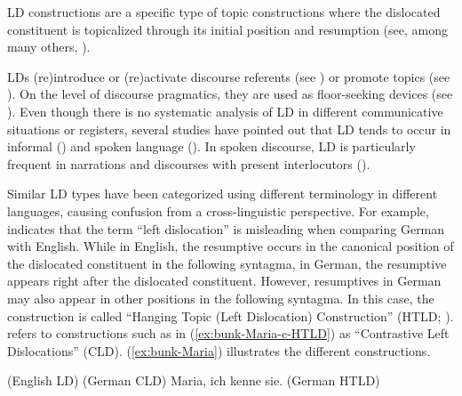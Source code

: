 \documentclass[output=paper,colorlinks,citecolor=brown]{langscibook}
\begin{document}
LD constructions are a specific type of topic constructions where the dislocated constituent is topicalized through its initial position and resumption (see, among many others, \cite{altmann_formen_1981}).

LDs (re)introduce or (re)activate discourse referents (see \cite{westbury_left_2016}) or promote topics (see \cite{gregory_topicalization_2001, frey_pragmatic_2005}). On the level of discourse pragmatics, they are used as floor-seeking devices (see \cite{duranti_left-dislocation_1979}). Even though there is no systematic analysis of LD in different communicative situations or registers, several studies have pointed out that LD tends to occur in informal (\cite{geluykens_discourse_1992}) and spoken language (\cite{shaer_integrated_2004, guryev_left-dislocation_nodate}). In spoken discourse, LD is particularly frequent in narrations and discourses with present interlocutors (\cite{bousquette_competition_2021}).

Similar LD types have been categorized using different terminology in different languages, causing confusion from a cross-linguistic perspective. For example, \citet{frey_pragmatic_2005} indicates that the term “left dislocation” is misleading when comparing German with English. While in English, the resumptive occurs in the canonical position of the dislocated constituent in the following syntagma, in German, the resumptive appears right after the dislocated constituent. However, resumptives in German may also appear in other positions in the following syntagma. In this case, the construction is called “Hanging Topic (Left Dislocation) Construction” (HTLD; \cite{altmann_formen_1981, selting_voranstellungen_1993, frey_pragmatic_2005}). \citet{frey_pragmatic_2005} refers to constructions such as in (\ref{ex:bunk-Maria-c-HTLD}) as “Contrastive Left Dislocations” (CLD). (\ref{ex:bunk-Maria}) illustrates the different constructions. 

\begin{exe}
    \ex \label{ex:bunk-Maria}
    \begin{xlist}
         (English LD) 
         (German CLD) 
        \ex \label{ex:bunk-Maria-c-HTLD}
        {Maria, ich kenne sie.} (German HTLD) 
    \end{xlist}
\end{exe}
 
\end{document}
